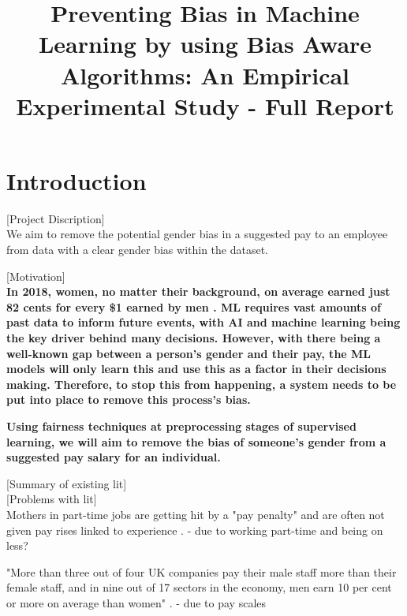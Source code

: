 \documentclass{sigchi}
\def\plaintitle{Preventing Bias in Machine Learning by using Bias Aware Algorithms: An Empirical Experimental Study - Full Report}
\begin{document}
\title{\plaintitle}

\author{%
}

\maketitle

\section{Introduction}

[Project Discription]\\
We aim to remove the potential gender bias in a suggested pay to an employee from data with a clear gender bias within the dataset. 

[Motivation]\\
\textbf{In 2018, women, no matter their background, on average earned just 82 cents for every \$1 earned by men \cite{1}. ML requires vast amounts of past data to inform future events, with AI and machine learning being the key driver behind many decisions. However, with there being a well-known gap between a person's gender and their pay, the ML models will only learn this and use this as a factor in their decisions making. Therefore, to stop this from happening, a system needs to be put into place to remove this process's bias.} 

\textbf{Using fairness techniques at preprocessing stages \cite{3} of supervised learning, we will aim to remove the bias of someone's gender from a suggested pay salary for an individual. } %

[Summary of existing lit]\\


[Problems with lit]\\
	Mothers in part-time jobs are getting hit by a "pay penalty" and are often not given pay rises linked to experience \cite{bbc_mothers_suffering}. - due to working part-time and being on less?

	"More than three out of four UK companies pay their male staff more than their female staff, and in nine out of 17 sectors in the economy, men earn 10 per cent or more on average than women" \cite{gender_pay_FT}. - due to pay scales
\end{document}
